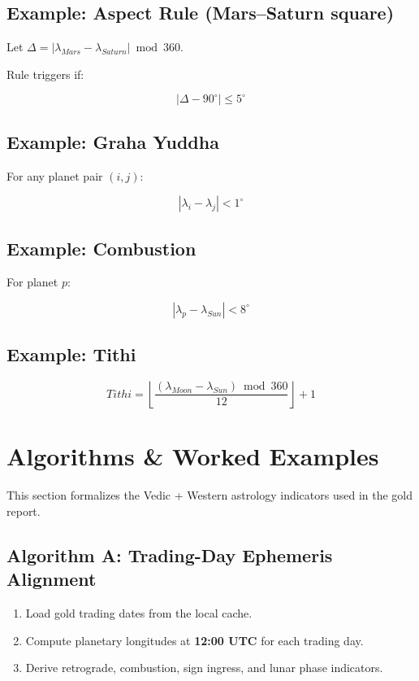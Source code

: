 \documentclass[
  11pt,
  a4paper,
  oneside,
  openany]{report}
\providecommand{\tightlist}{%
  \setlength{\itemsep}{0pt}\setlength{\parskip}{0pt}}\usepackage{longtable,booktabs,array}
\begin{document}
\section{Example: Aspect Rule (Mars--Saturn
square)}\label{example-aspect-rule-marssaturn-square}

Let \(\Delta = |\lambda_{Mars} - \lambda_{Saturn}| \bmod 360\).

Rule triggers if:

\[
|\Delta - 90^\circ| \leq 5^\circ
\]

\section{Example: Graha Yuddha}\label{example-graha-yuddha}

For any planet pair \((i,j)\):

\[
|\lambda_i - \lambda_j| < 1^\circ
\]

\section{Example: Combustion}\label{example-combustion}

For planet \(p\):

\[
|\lambda_p - \lambda_{Sun}| < 8^\circ
\]

\section{Example: Tithi}\label{example-tithi}

\[
Tithi = \left\lfloor \frac{(\lambda_{Moon}-\lambda_{Sun}) \bmod 360}{12} \right\rfloor + 1
\]

\chapter{Algorithms \& Worked
Examples}\label{algorithms-worked-examples-1}

This section formalizes the Vedic + Western astrology indicators used in
the gold report.

\section{Algorithm A: Trading-Day Ephemeris
Alignment}\label{algorithm-a-trading-day-ephemeris-alignment}

\begin{enumerate}
\def\labelenumi{\arabic{enumi}.}
\tightlist
\item
  Load gold trading dates from the local cache.
\item
  Compute planetary longitudes at \textbf{12:00 UTC} for each trading
  day.
\item
  Derive retrograde, combustion, sign ingress, and lunar phase
  indicators.
\end{enumerate}
\end{document}
